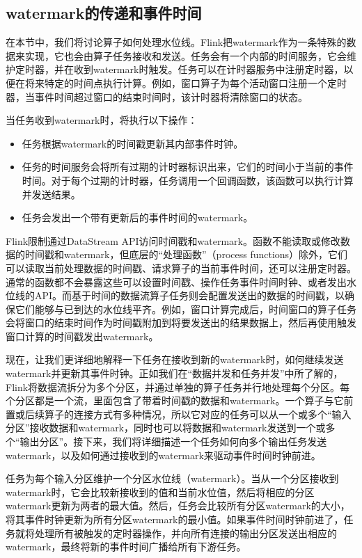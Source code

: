 \documentclass[cn,11pt,chinese]{elegantbook}
\begin{document}
\subsection{watermark的传递和事件时间}

在本节中，我们将讨论算子如何处理水位线。Flink把watermark作为一条特殊的数据来实现，它也会由算子任务接收和发送。任务会有一个内部的时间服务，它会维护定时器，并在收到watermark时触发。任务可以在计时器服务中注册定时器，以便在将来特定的时间点执行计算。例如，窗口算子为每个活动窗口注册一个定时器，当事件时间超过窗口的结束时间时，该计时器将清除窗口的状态。

当任务收到watermark时，将执行以下操作：

\begin{itemize}
    \item 任务根据watermark的时间戳更新其内部事件时钟。
    \item 任务的时间服务会将所有过期的计时器标识出来，它们的时间小于当前的事件时间。对于每个过期的计时器，任务调用一个回调函数，该函数可以执行计算并发送结果。
    \item 任务会发出一个带有更新后的事件时间的watermark。
\end{itemize}

\begin{note}
    Flink限制通过DataStream API访问时间戳和watermark。函数不能读取或修改数据的时间戳和watermark，但底层的“处理函数”（process functions）除外，它们可以读取当前处理数据的时间戳、请求算子的当前事件时间，还可以注册定时器。通常的函数都不会暴露这些可以设置时间戳、操作任务事件时间时钟、或者发出水位线的API。而基于时间的数据流算子任务则会配置发送出的数据的时间戳，以确保它们能够与已到达的水位线平齐。例如，窗口计算完成后，时间窗口的算子任务会将窗口的结束时间作为时间戳附加到将要发送出的结果数据上，然后再使用触发窗口计算的时间戳发出watermark。
\end{note}

现在，让我们更详细地解释一下任务在接收到新的watermark时，如何继续发送watermark并更新其事件时钟。正如我们在“数据并发和任务并发”中所了解的，Flink将数据流拆分为多个分区，并通过单独的算子任务并行地处理每个分区。每个分区都是一个流，里面包含了带着时间戳的数据和watermark。一个算子与它前置或后续算子的连接方式有多种情况，所以它对应的任务可以从一个或多个“输入分区”接收数据和watermark，同时也可以将数据和watermark发送到一个或多个“输出分区”。接下来，我们将详细描述一个任务如何向多个输出任务发送watermark，以及如何通过接收到的watermark来驱动事件时间时钟前进。

任务为每个输入分区维护一个分区水位线（watermark）。当从一个分区接收到watermark时，它会比较新接收到的值和当前水位值，然后将相应的分区watermark更新为两者的最大值。然后，任务会比较所有分区watermark的大小，将其事件时钟更新为所有分区watermark的最小值。如果事件时间时钟前进了，任务就将处理所有被触发的定时器操作，并向所有连接的输出分区发送出相应的watermark，最终将新的事件时间广播给所有下游任务。
\end{document}
